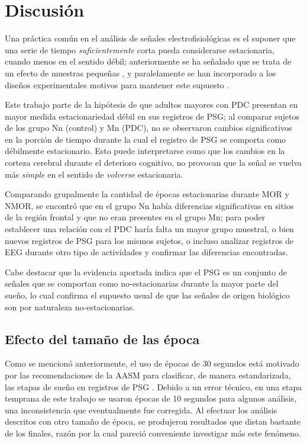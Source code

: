\section{Discusión}

Una práctica común en el análisis de señales electrofisiológicas es el suponer que una serie de 
tiempo \textit{suficientemente} corta pueda considerarse estacionaria, cuando menos en el sentido
débil; anteriormente se ha señalado que se trata de un efecto de muestras pequeñas \cite{Melard89},
y paralelamente se han incorporado a los diseños experimentales motivos para mantener este supuesto
\cite{Kaiser00}.

Este trabajo parte de la hipótesis de que adultos mayores con PDC presentan en mayor medida 
estacionariedad débil en sus registros de PSG; al comparar sujetos de los grupo Nn (control) y Mn 
(PDC), no se observaron cambios significativos en la porción de tiempo durante la cual el registro 
de PSG se comporta como débilmente estacionario. 
Esto puede interpretarse como que los cambios en la corteza cerebral durante el deterioro 
cognitivo, no provocan que  la señal se vuelva más \textit{simple} en el sentido de 
\textit{volverse} estacionaria.

Comparando grupalmente la cantidad de épocas estacionarias durante MOR y NMOR, se encontró que en 
el grupo Nn había diferencias significativas en sitios de la región frontal y que no eran presentes
en el grupo Mn; para poder establecer una relación con el PDC haría falta un mayor grupo muestral, 
o bien nuevos registros de PSG para los mismos sujetos, o incluso analizar registros de EEG durante 
otro tipo de actividades y confirmar las diferencias encontradas.

Cabe destacar que la evidencia aportada indica que el PSG es un conjunto de señales que se comportan
como no-estacionarias durante la mayor parte del sueño, lo cual confirma el supuesto usual de que 
las señales de origen biológico son por naturaleza no-estacionarias. 

\subsection{Efecto del tamaño de las época}

Como se mencionó anteriormente, el uso de épocas de 30 segundos está motivado por las 
recomendaciones de la AASM para clasificar, de manera estandarizada, las etapas de sueño en
registros de PSG \cite{AASM07}. 
Debido a un error técnico, en una etapa temprana de este trabajo se usaron épocas de 10 segundos 
para algunos análisis, una inconsistencia que eventualmente fue corregida.
Al efectuar los análisis descritos con otro tamaño de época, se produjeron resultados que distan
bastante de los finales, razón por la cual pareció conveniente investigar más este fenómeno.

